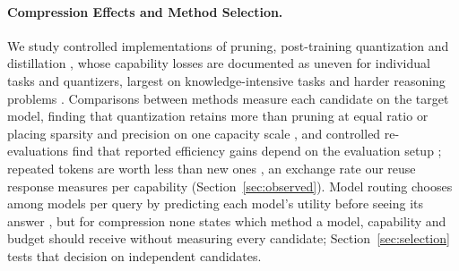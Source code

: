 \paragraph{Compression Effects and Method Selection.}
We study controlled implementations of pruning, post-training quantization and
distillation
\citep{lecun1989optimal,han2015deep,frankle2019lottery,frantar2023sparsegpt,sun2023simple,ma2023llmpruner,ashkboos2024slicegpt,men2024shortgpt,dettmers2022llmint8,frantar2022gptq,xiao2022smoothquant,lin2023awq,chee2023quip,shao2023omniquant,dettmers2023qlora,hinton2015distilling,sanh2019distilbert,hsieh2023distilling,mukherjee2023orca,gu2023minillm,agarwal2023gkd,xu2024survey},
whose capability losses are documented as uneven for individual tasks and quantizers, largest on
knowledge-intensive tasks and harder reasoning problems
\citep{jaiswal2023compressing,liu2025quantization,ouyang2024lowbit,hong2024decoding,sengupta2025compression}.
Comparisons between methods measure each candidate on the target model, finding that quantization
retains more than pruning at equal ratio \citep{jaiswal2023compressing} or placing sparsity and
precision on one capacity scale \citep{panferov2025unified}, and controlled re-evaluations find that
reported efficiency gains depend on the evaluation setup \citep{zhang2026rethinking}; repeated
tokens are worth less than new ones \citep{muennighoff2023scaling}, an exchange rate our reuse response measures per capability
(Section~\ref{sec:observed}). Model routing chooses among models per query by predicting each
model's utility before seeing its answer \citep{cheng2026latentrouter}, but for compression none states
which method a model, capability and budget should receive without measuring every candidate;
Section~\ref{sec:selection} tests that decision on independent candidates.
